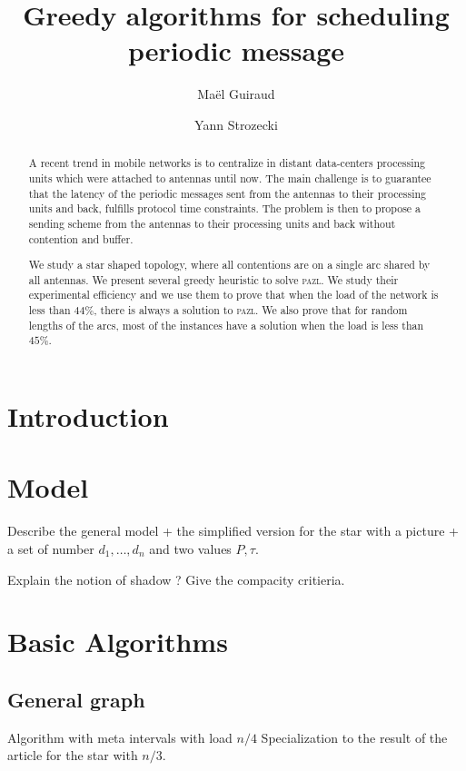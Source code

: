 \documentclass[10pt, conference, letterpaper]{IEEEtran}
\title{Greedy algorithms for scheduling periodic message }
\author[1,2]{Ma\"el Guiraud}
\author[1]{Yann Strozecki}
\affil[1]{David Laboratory, UVSQ}
\affil[2]{Nokia Bell Labs France}
\newcommand\pazl{\textsc{pazl}\xspace}
\begin{document}
\maketitle

\begin{abstract}

A recent trend in mobile networks is to centralize in distant data-centers  processing units which were attached to antennas until now. The main challenge is to guarantee that the latency of the periodic messages sent from the antennas to their processing units and back, fulfills protocol time constraints. The problem is then to propose a sending scheme from the antennas to their processing units and back without contention and buffer.

We study a star shaped topology, where all contentions are on a single arc shared by all antennas. We present several greedy heuristic to solve \pazl. We study their experimental efficiency and we use them to prove that when the load of the network is less than $44\%$, there is always a solution to \pazl. We also prove that for random lengths of the arcs, most of the instances have a solution when the load is less than $45\%$.  
\end{abstract}


\section{Introduction}


\section{Model}
Describe the general model + the simplified version for the star with a picture + a set of number $d_1,\dots,d_n$
and two values $P, \tau$. 
\cite{Guir1806:Deterministic}

Explain the notion of shadow ? Give the compacity critieria.

\section{Basic Algorithms}

\subsection{General graph}

Algorithm with meta intervals with load $n/4$
Specialization to the result of the article for the star with $n/3$.
\end{document}
